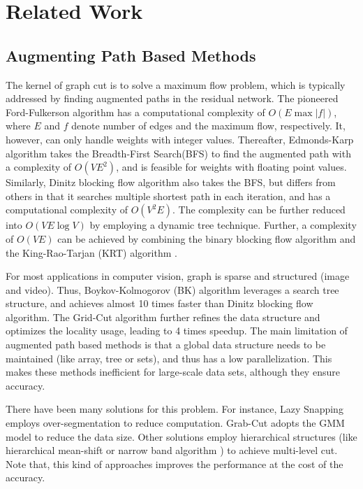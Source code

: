 
\section{Related Work}
\label{section related work}

\subsection{Augmenting Path Based Methods}

The kernel of graph cut is to solve a maximum flow problem, which is typically addressed by finding augmented paths in the residual network.
The pioneered Ford-Fulkerson algorithm has a computational complexity of $O(E \max|f|)$, where $E$ and $f$ denote number of edges and the maximum flow, respectively.
It, however, can only handle weights with integer values.
Thereafter, Edmonds-Karp algorithm takes the Breadth-First Search(BFS) to find the augmented path with a complexity of $O(V E^2)$, and is feasible for weights with floating point values.
Similarly, Dinitz blocking flow algorithm also takes the BFS, but differs from others in that it searches multiple shortest path in each iteration, and has a computational complexity of $O(V^2 E)$.
The complexity can be further reduced into $O(V E \log V)$ by employing a dynamic tree technique.
Further, a complexity of $O(V E)$ can be achieved by combining the binary blocking flow algorithm and the King-Rao-Tarjan (KRT) algorithm \cite{13O}.

For most applications in computer vision, graph is sparse and structured (image and video).
Thus, Boykov-Kolmogorov (BK) algorithm \cite{04BK} leverages a search tree structure, and achieves almost 10 times faster than Dinitz blocking flow algorithm.
The Grid-Cut algorithm \cite{12JSH} further refines the data structure and optimizes the locality usage, leading to 4 times speedup.
The main limitation of augmented path based methods is that a global data structure needs to be maintained (like array, tree or sets), and thus has a low parallelization.
This makes these methods inefficient for large-scale data sets, although they ensure accuracy.

There have been many solutions for this problem.
For instance, Lazy Snapping \cite{04LSTS} employs over-segmentation to reduce computation.
Grab-Cut \cite{04RKB} adopts the GMM model to reduce the data size.
Other solutions employ hierarchical structures (like hierarchical mean-shift \cite{05WBCAC} or narrow band algorithm \cite{05LSGX}) to achieve multi-level cut.
Note that, this kind of approaches improves the performance at the cost of the accuracy.

